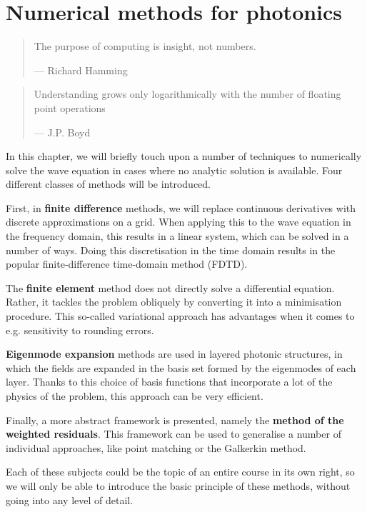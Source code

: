 \chapter{Numerical methods for photonics}
\label{h:numeric}

\begin{quote}
The purpose of computing is insight, not numbers.

--- Richard Hamming
\end{quote}

\begin{quote}
Understanding grows only logarithmically with the number of floating point operations 

--- J.P. Boyd
\end{quote}

\chaptertoc


In this chapter, we will briefly touch upon a number of techniques to numerically solve the wave equation in cases where no analytic solution is available. Four different classes of methods will be introduced.

First, in \textbf{finite difference} methods, we will replace continuous derivatives with discrete approximations on a grid. When applying this to the wave equation in the frequency domain, this results in a linear system, which can be solved in a number of ways. Doing this discretisation in the time domain results in the popular finite-difference time-domain method (FDTD).

The \textbf{finite element} method does not directly solve a differential equation. Rather, it tackles the problem obliquely by converting it into a minimisation procedure. This so-called variational approach has advantages when it comes to e.g. sensitivity to rounding errors.

\textbf{Eigenmode expansion} methods are used in layered photonic structures, in which the fields are expanded in the basis set formed by the eigenmodes of each layer. Thanks to this choice of basis functions that incorporate a lot of the physics of the problem, this approach can be very efficient.

Finally, a more abstract framework is presented, namely the \textbf{method of the weighted residuals}. This framework can be used to generalise a number of individual approaches, like point matching or the Galkerkin method.

Each of these subjects could be the topic of an entire course in its own right, so we will only be able to introduce the basic principle of these methods, without going into any level of detail.



